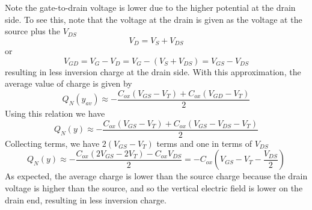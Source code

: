 Note the gate-to-drain voltage is lower due to the higher potential at the drain side.  To see this, note that 
the voltage at the drain is given as the voltage at the source plus the $V_{DS}$
    \[
    	V_D = V_S + V_{DS}
    \]
    or
    \[
    	V_{GD} = V_{G} - V_{D} = V_{G} - (V_S + V_{DS}) = V_{GS} - V_{DS} 
    \]
resulting in less inversion charge at the drain side.  With this approximation, the average value of charge is given by
    \begin{equation}
        {Q_N}(y_{av}) \approx  - \frac{{{C_{ox}}({V_{GS}} - {V_T}) + {C_{ox}}({V_{GD}} - {V_T})}}{2}
    \end{equation}
Using this relation we have
    \begin{equation}
        {Q_N}(y) \approx  - \frac{{{C_{ox}}({V_{GS}} - {V_T}) + {C_{ox}}({V_{GS}} - {V_{DS}} - {V_T})}}{2}
    \end{equation}
Collecting terms, we have $2(V_{GS} - V_T)$ terms and one in terms of $V_{DS}$
    \begin{equation}
        {Q_N}(y) \approx  - \frac{{{C_{ox}}(2{V_{GS}} - 2{V_T}) - {C_{ox}}{V_{DS}}}}{2} =  - {C_{ox}}({V_{GS}} - {V_T} - \frac{{{V_{DS}}}}{2})
    \end{equation}
As expected, the average charge is lower than the source charge because the drain voltage is higher than the source, and so the vertical electric field is lower on the drain end, resulting in less inversion charge.
